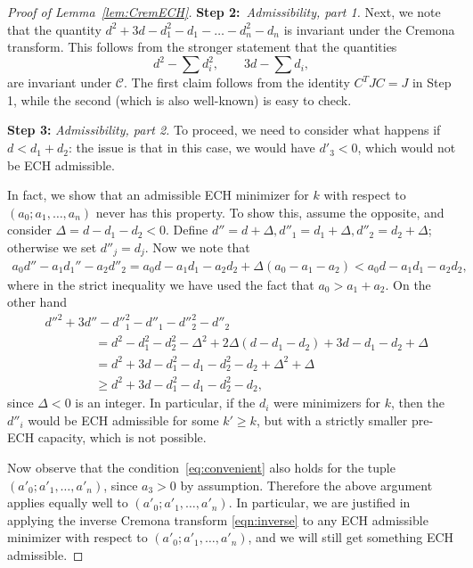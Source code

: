 \documentclass[11pt, reqno]{amsart}
\theoremstyle{remark}
\numberwithin{equation}{subsection}
\numberwithin{figure}{section}
\theoremstyle{customremark}
\newcommand{\NI}{{\noindent}}
\newcommand{\Cc}{{\mathcal C}}
\begin{document}
\begin{proof}[Proof of Lemma~\ref{lem:CremECH}]
\vspace{2 mm}
\NI
{\bf Step 2:}\ {\it   Admissibility, part 1.}  Next, we note that the quantity $d^2 + 3d - d_1^2 - d_1 - \ldots - d_n^2 - d_n$ is invariant under the Cremona transform.   This follows from the stronger statement that the quantities
\[ d^2 - \sum d_i ^2, \quad \quad 3d - \sum d_i,\]
are invariant under $\Cc$. 
The first claim follows from the identity $C^T J C = J$ in  Step 1, while the second
(which is also  well-known) is  easy to check. 

\vspace{2 mm}
\NI
{\bf Step 3:} {\it  Admissibility, part 2.}
To proceed, we need to consider what happens if $d < d_1 + d_2$: the issue is that in this case, we would have $d'_3 < 0$, which would not be ECH admissible.  

In fact, we show that an admissible ECH minimizer for $k$ with respect to $(a_0; a_1, \ldots, a_n)$ never has this property.  To show this, assume the opposite, and  
consider $\Delta = d - d_1 - d_2 < 0$.  Define $d'' = d + \Delta, d''_1 = d_1 + \Delta, d''_2 = d_2 + \Delta$; otherwise we set $d''_j  = d_j$.  Now we note that
\begin{align}\label{eq:<}
a_0d'' - a_1d_1'' - a_2d''_2 = a_0d - a_1d_1 - a_2d_2 + \Delta(a_0 - a_1 - a_2) < a_0d - a_1d_1 - a_2d_2,
\end{align}
where in the strict inequality we have used the fact that $a_0 > a_1 + a_2$.  On the other hand
\begin{align*} &d''^2 + 3d'' - d''^2_1 - d''_1 - d''^2_2 - d''_2\\
 &\qquad\qquad = d^2 - d^2_1 - d^2_2 - \Delta^2 + 2 \Delta(d - d_1 - d_2) + 3d - d_1 - d_2 + \Delta
\\
&\qquad\qquad  = d^2 + 3d - d_1^2 - d_1 - d_2^2 - d_2 + \Delta^2 + \Delta \\
&\qquad\qquad  \ge d^2 + 3d - d_1^2 - d_1 - d_2^2 - d_2,
\end{align*}
since $\Delta<0$ is an integer.  
In particular, if the $d_i$ were minimizers for $k$,  then the $d''_i$ would be ECH admissible for some $k' \ge k$, but with a strictly smaller pre-ECH capacity, which is not possible.  

Now observe that the condition~\eqref{eq:convenient} also holds for the tuple  $(a'_0; a'_1, \ldots, a'_n)$, since  $a_3 > 0$ by
assumption. 
Therefore the above argument applies equally well to $(a'_0; a'_1, \ldots, a'_n)$.
In particular, we are justified in applying the inverse Cremona transform \eqref{eqn:inverse} to any ECH admissible minimizer with respect to $(a'_0; a'_1, \ldots, a'_n)$, and we will still get something ECH admissible. 


\end{proof}
\end{document}
